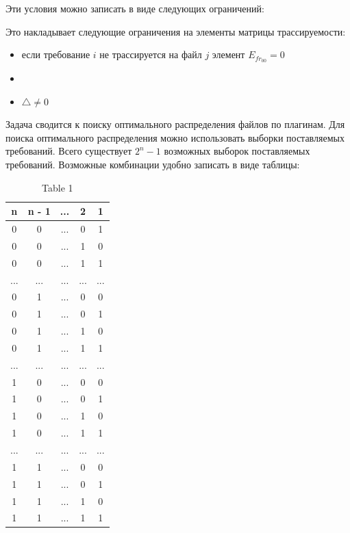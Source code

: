 \documentclass{article}
\begin{document}
  Эти условия можно записать в виде следующих ограничений:



  Это накладывает следующие ограничения на элементы матрицы трассируемости:
  \begin{itemize}
    \item если требование $i$ не трассируется на файл $j$ элемент $E_{fr_{00}} = 0$
    \item 
    \item $\bigtriangleup \not = 0$

  \end{itemize}

  Задача сводится к поиску оптимального распределения файлов по плагинам. Для поиска оптимального распределения можно использовать выборки поставляемых требований. Всего существует $2^n - 1$ возможных выборок поставляемых требований. Возможные комбинации удобно записать в виде таблицы:
  \begin{table}[H]
    \caption{Table 1}
    \begin{center}
      \begin{tabular}[H]{|c|c|c|c|c|}
         n  & n - 1 & ... &  2  &  1  \\
         \hline
         0  &   0   & ... &  0  &  1  \\
         0  &   0   & ... &  1  &  0  \\
         0  &   0   & ... &  1  &  1  \\
        ... &  ...  & ... & ... & ... \\
         0  &   1   & ... &  0  &  0  \\
         0  &   1   & ... &  0  &  1  \\
         0  &   1   & ... &  1  &  0  \\
         0  &   1   & ... &  1  &  1  \\
        ... &  ...  & ... & ... & ... \\
         1  &   0   & ... &  0  &  0  \\
         1  &   0   & ... &  0  &  1  \\
         1  &   0   & ... &  1  &  0  \\
         1  &   0   & ... &  1  &  1  \\
        ... &  ...  & ... & ... & ... \\
         1  &   1   & ... &  0  &  0  \\
         1  &   1   & ... &  0  &  1  \\
         1  &   1   & ... &  1  &  0  \\
         1  &   1   & ... &  1  &  1  \\
      \end{tabular}
    \end{center}
  \end{table}
\end{document}
